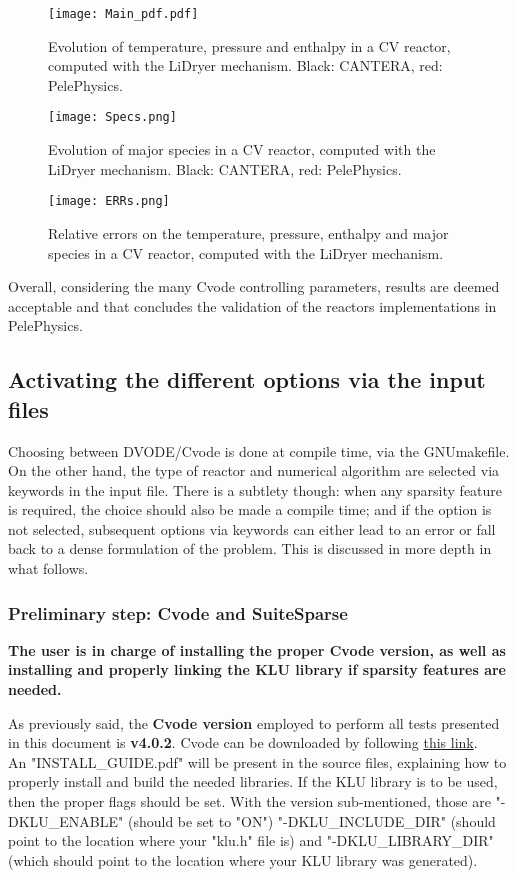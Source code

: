 \documentclass[12pt]{article}
\begin{document}
\begin{figure*}[http]
\centering
\texttt{[image: Main\_pdf.pdf]}
\caption{Evolution of temperature, pressure and enthalpy in a CV reactor, computed with the LiDryer mechanism. Black: CANTERA, red: PelePhysics.}
\label{Fig:MainH2}
\end{figure*}

\begin{figure*}
\centering
\texttt{[image: Specs.png]}
\caption{Evolution of major species in a CV reactor, computed with the LiDryer mechanism. Black: CANTERA, red: PelePhysics.}
\label{Fig:SpecsH2}
\end{figure*}

\begin{figure*}
\centering
\texttt{[image: ERRs.png]}
\caption{Relative errors on the temperature, pressure, enthalpy and major species in a CV reactor, computed with the LiDryer mechanism.}
\label{Fig:ErrH2}
\end{figure*}

Overall, considering the many Cvode controlling parameters, results are deemed acceptable and that concludes the validation of the reactors implementations in PelePhysics.

\subsection{Activating the different options via the input files}
\label{subs::PPOptions}
Choosing between DVODE/Cvode is done at compile time, via the GNUmakefile. On the other hand, the type of reactor and numerical algorithm are selected via keywords in the input file. There is a subtlety though: when any sparsity feature is required, the choice should also be made a compile time; and if the option is not selected, subsequent options via keywords can either lead to an error or fall back to a dense formulation of the problem. This is discussed in more depth in what follows.

\subsubsection{Preliminary step: Cvode and SuiteSparse}
\textbf{The user is in charge of installing the proper Cvode version, as well as installing and properly linking the KLU library if sparsity features are needed.}

As previously said, the \textbf{Cvode version} employed to perform all tests presented in this document is \textbf{v4.0.2}. Cvode can be downloaded by following \href{https://computation.llnl.gov/projects/sundials/sundials-software}{this link}. \\ 
An "INSTALL_GUIDE.pdf" will be present in the source files, explaining how to properly install and build the needed libraries. If the KLU library is to be used, then the proper flags should be set. With the version sub-mentioned, those are "-DKLU_ENABLE" (should be set to "ON")  "-DKLU_INCLUDE_DIR" (should point to the location where your "klu.h" file is) and "-DKLU_LIBRARY_DIR" (which should point to the location where your KLU library was generated). 
\end{document}
